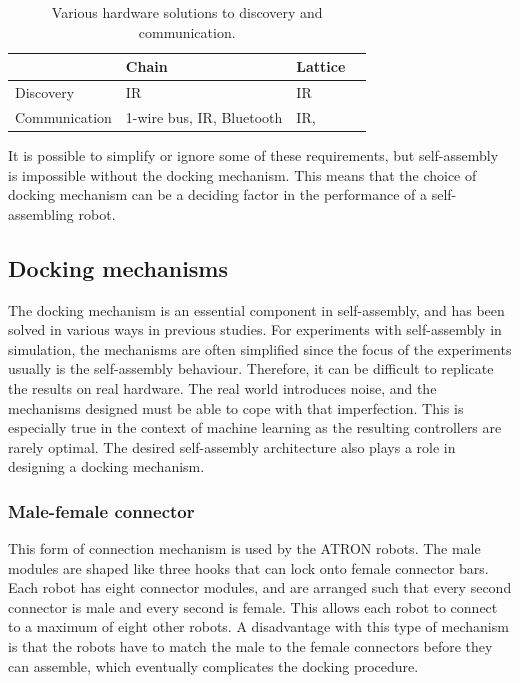 \begin{table}[H]
	\centering
	
	\begin{tabular}{ | l | l | l |p{5cm} |}
		\hline
		& Chain 						& Lattice \\ \hline
		Discovery 		& IR\cite{castano_conro:_2000}  & IR\cite{gilpin_miche:_2008} \\ \hline
		Communication 	& 1-wire bus\cite{zykov_molecubes:_2007}, IR\cite{castano_conro:_2000}, Bluetooth{\cite{mockel_yamor_2006}} & IR\cite{brandt_atron_2007},\cite{gilpin_miche:_2008}  \\\hline
	\end{tabular}
	\caption{Various hardware solutions to discovery and communication.}
	\label{tab:hardware-mechanisms}
\end{table}


It is possible to simplify or ignore some of these requirements, but self-assembly is impossible without the docking mechanism.
This means that the choice of docking mechanism can be a deciding factor in the performance of a self-assembling robot. 


\subsection{Docking mechanisms}
\label{sec:mechanisms}
The docking mechanism is an essential component in self-assembly, and has been solved in various ways in previous studies.
For experiments with self-assembly in simulation, the mechanisms are often simplified since the focus of the experiments usually is the self-assembly behaviour.
Therefore, it can be difficult to replicate the results on real hardware.
The real world introduces noise, and the mechanisms designed must be able to cope with that imperfection.
This is especially true in the context of machine learning as the resulting controllers are rarely optimal.
The desired self-assembly architecture also plays a role in designing a docking mechanism.

\subsubsection*{Male-female connector}
This form of connection mechanism is used by the ATRON\cite{brandt_atron_2007} robots.
The male modules are shaped like three hooks that can lock onto female connector bars.
Each robot has eight connector modules, and are arranged such that every second connector is male and every second is female.
This allows each robot to connect to a maximum of eight other robots.
A disadvantage with this type of mechanism is that the robots have to match the male to the female connectors before they can assemble, which eventually complicates the docking procedure.
